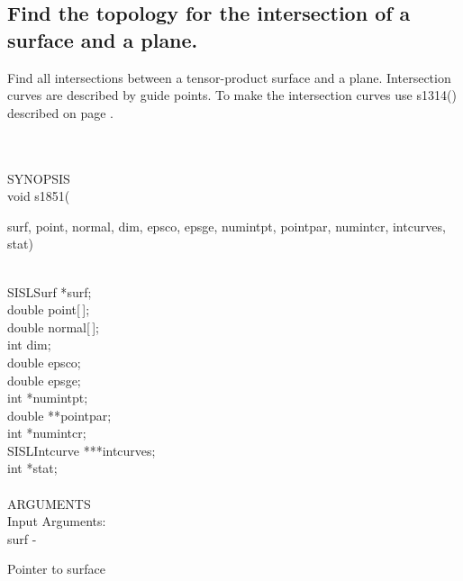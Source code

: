 \subsection{Find the topology for the intersection of a surface and a plane.}
\begin{minipg1}
  Find all intersections between a tensor-product surface and a plane.
  Intersection curves are described by guide points.
  To make the intersection curves use s1314() described on page \pageref{s1314}.
\end{minipg1} \\ \\
SYNOPSIS\\
        \>void s1851(\begin{minipg3}
                        {\fov surf}, {\fov point}, {\fov normal},
                {\fov dim}, {\fov epsco}, {\fov epsge}, {\fov numintpt},
                {\fov pointpar}, {\fov numintcr},
                        {\fov intcurves}, {\fov stat})
                \end{minipg3}\\[0.3ex]
                \>\>    SISLSurf        \>      *{\fov surf};\\
                \>\>    double  \>      {\fov point}[\,];\\
                \>\>    double  \>      {\fov normal}[\,];\\
                \>\>    int     \>      {\fov dim};\\
                \>\>    double  \>      {\fov epsco};\\
                \>\>    double  \>      {\fov epsge};\\
                \>\>    int     \>      *{\fov numintpt};\\
                \>\>    double  \>      **{\fov pointpar};\\
                \>\>    int     \>      *{\fov numintcr};\\
                \>\>    SISLIntcurve\>  ***{\fov intcurves};\\
                \>\>    int     \>      *{\fov stat};\\
\\
ARGUMENTS\\
        \>Input Arguments:\\
        \>\>    {\fov surf}\> - \>      \begin{minipg2}
                                Pointer to surface
                                \end{minipg2}\\
